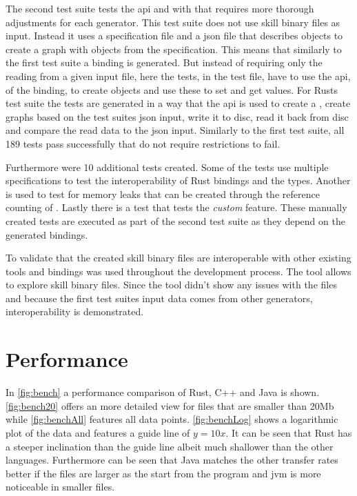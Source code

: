 \documentclass[thesis]{subfiles}
\begin{document}
  The second test suite tests the \gls{api} and with that requires more thorough adjustments for each generator.
  This test suite does not use \gls{skill} binary files as input.
  Instead it uses a specification file and a \gls{json} file that describes objects to create a graph with objects from the specification.
  This means that similarly to the first test suite a binding is generated.
  But instead of requiring only the reading from a given input file, here the tests, in the test file, have to use the \gls{api}, of the binding, to create objects and use these to set and get values.
  For Rusts test suite the tests are generated in a way that the \gls{api} is used to create a \SkillFile, create graphs based on the test suites \gls{json} input, write it to disc, read it back from disc and compare the read data to the \gls{json} input.
  Similarly to the first test suite, all 189 tests pass successfully that do not require restrictions to fail.%

  Furthermore were 10 additional tests created.
  Some of the tests use multiple specifications to test the interoperability of Rust bindings and the \Foreign types.
  Another is used to test for memory leaks that can be created through the reference counting of \PtrT.
  Lastly there is a test that tests the \emph{custom} feature.
  These manually created tests are executed as part of the second test suite as they depend on the generated bindings.

  To validate that the created \gls{skill} binary files are interoperable with other existing tools and bindings \autocite{skill-view} was used throughout the development process.
  The tool allows to explore \gls{skill} binary files.
  Since the tool didn't show any issues with the files and because the first test suites input data comes from other generators, interoperability is demonstrated.

\section{Performance}
  In \autoref{fig:bench} a performance comparison of Rust, C++ and Java is shown.
  \autoref{fig:bench20} offers an more detailed view for files that are smaller than 20Mb while \autoref{fig:benchAll} features all data points.
  \autoref{fig:benchLog} shows a logarithmic plot of the data and features a guide line of $y=10x$.
  It can be seen that Rust has a steeper inclination than the guide line albeit much shallower than the other languages.
  Furthermore can be seen that Java matches the other transfer rates better if the files are larger as the start from the program and \gls{jvm} is more noticeable in smaller files.
\end{document}
